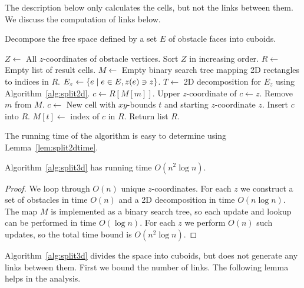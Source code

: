 \documentclass[english,gradu]{tktltiki2018}
\begin{document}
The description below only calculates the cells, but not the links between them.
We discuss the computation of links below.

\begin{alg}\label{alg:split3d}
Decompose the free space defined by a set $E$ of obstacle faces into cuboids.
\begin{algorithmic}
\State $Z\gets$ All $z$-coordinates of obstacle vertices.
\State Sort $Z$ in increasing order.
\State $R\gets$ Empty list of result cells.
\State $M\gets$ Empty binary search tree mapping 2D rectangles to indices in $R$.
	\State $E_z\gets\left\{e \mid e\in E, z(e)\ni z\right\}$.
	\State $T\gets$ 2D decomposition for $E_z$ using Algorithm~\ref{alg:split2d}.
		\State $c\gets R[M[m]]$.
		\State Upper $z$-coordinate of $c\gets z$.
		\State Remove $m$ from $M$.
	\EndFor
		\State $c\gets$ New cell with $xy$-bounds $t$ and starting $z$-coordinate $z$.
		\State Insert $c$ into $R$.
		\State $M[t]\gets$ index of $c$ in $R$.
	\EndFor
\EndFor
\State Return list $R$.
\end{algorithmic}
\end{alg}

The running time of the algorithm is easy to determine using Lemma~\ref{lem:split2dtime}.

\begin{lem}\label{lem:split3dtime}Algorithm~\ref{alg:split3d} has running time $O(n^2\log n)$.\end{lem}
\begin{proof}
We loop through $O(n)$ unique $z$-coordinates.
For each $z$ we construct a set of obstacles in time $O(n)$ and a 2D decomposition in time $O(n\log n)$.
The map $M$ is implemented as a binary search tree, so each update and lookup can be performed in time $O(\log n)$.
For each $z$ we perform $O(n)$ such updates, so the total time bound is $O(n^2\log n)$.
\end{proof}

Algorithm~\ref{alg:split3d} divides the space into cuboids, but does not generate any links between them.
First we bound the number of links.
The following lemma helps in the analysis.
\end{document}
